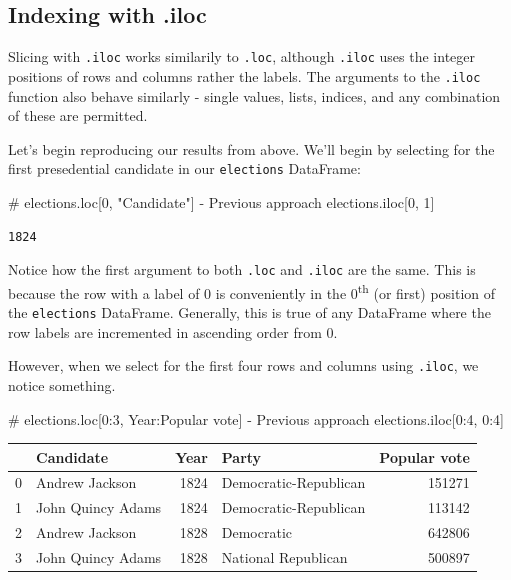 \documentclass[
  letterpaper,
  DIV=11,
  numbers=noendperiod]{scrreprt}
\newenvironment{Shaded}{\begin{snugshade}}{\end{snugshade}}
\newcommand{\CommentTok}[1]{\textcolor[rgb]{0.37,0.37,0.37}{#1}}
\newcommand{\DecValTok}[1]{\textcolor[rgb]{0.68,0.00,0.00}{#1}}
\newcommand{\NormalTok}[1]{\textcolor[rgb]{0.00,0.23,0.31}{#1}}
\begin{document}
\hypertarget{indexing-with-.iloc}{%
\subsection{Indexing with .iloc}\label{indexing-with-.iloc}}

Slicing with \texttt{.iloc} works similarily to \texttt{.loc}, although
\texttt{.iloc} uses the integer positions of rows and columns rather the
labels. The arguments to the \texttt{.iloc} function also behave
similarly - single values, lists, indices, and any combination of these
are permitted.

Let's begin reproducing our results from above. We'll begin by selecting
for the first presedential candidate in our \texttt{elections}
DataFrame:

\begin{Shaded}
\begin{Highlighting}[]
\CommentTok{\# elections.loc[0, "Candidate"] {-} Previous approach}
\NormalTok{elections.iloc[}\DecValTok{0}\NormalTok{, }\DecValTok{1}\NormalTok{]}
\end{Highlighting}
\end{Shaded}

\begin{verbatim}
1824
\end{verbatim}

Notice how the first argument to both \texttt{.loc} and \texttt{.iloc}
are the same. This is because the row with a label of 0 is conveniently
in the 0\textsuperscript{th} (or first) position of the
\texttt{elections} DataFrame. Generally, this is true of any DataFrame
where the row labels are incremented in ascending order from 0.

However, when we select for the first four rows and columns using
\texttt{.iloc}, we notice something.

\begin{Shaded}
\begin{Highlighting}[]
\CommentTok{\# elections.loc[0:3, \textquotesingle{}Year\textquotesingle{}:\textquotesingle{}Popular vote\textquotesingle{}] {-} Previous approach}
\NormalTok{elections.iloc[}\DecValTok{0}\NormalTok{:}\DecValTok{4}\NormalTok{, }\DecValTok{0}\NormalTok{:}\DecValTok{4}\NormalTok{]}
\end{Highlighting}
\end{Shaded}

\begin{tabular}{llrlr}
\toprule
{} &          Candidate &  Year &                  Party &  Popular vote \\
\midrule
0 &     Andrew Jackson &  1824 &  Democratic-Republican &        151271 \\
1 &  John Quincy Adams &  1824 &  Democratic-Republican &        113142 \\
2 &     Andrew Jackson &  1828 &             Democratic &        642806 \\
3 &  John Quincy Adams &  1828 &    National Republican &        500897 \\
\bottomrule
\end{tabular}
\end{document}
